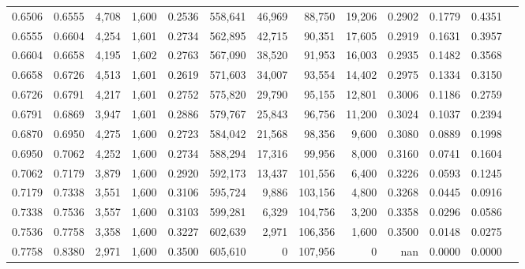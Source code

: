 \begin{tabular}{rrrrrrrrrrrrr}
0.6506 & 0.6555 &  4,708 & 1,600 &                                     0.2536 & 558,641 &  46,969 &  88,750 &  19,206 & 0.2902 & 0.1779 & 0.4351 \\
0.6555 & 0.6604 &  4,254 & 1,601 &                                     0.2734 & 562,895 &  42,715 &  90,351 &  17,605 & 0.2919 & 0.1631 & 0.3957 \\
0.6604 & 0.6658 &  4,195 & 1,602 &                                     0.2763 & 567,090 &  38,520 &  91,953 &  16,003 & 0.2935 & 0.1482 & 0.3568 \\
0.6658 & 0.6726 &  4,513 & 1,601 &                                     0.2619 & 571,603 &  34,007 &  93,554 &  14,402 & 0.2975 & 0.1334 & 0.3150 \\
0.6726 & 0.6791 &  4,217 & 1,601 &                                     0.2752 & 575,820 &  29,790 &  95,155 &  12,801 & 0.3006 & 0.1186 & 0.2759 \\
0.6791 & 0.6869 &  3,947 & 1,601 &                                     0.2886 & 579,767 &  25,843 &  96,756 &  11,200 & 0.3024 & 0.1037 & 0.2394 \\
0.6870 & 0.6950 &  4,275 & 1,600 &                                     0.2723 & 584,042 &  21,568 &  98,356 &   9,600 & 0.3080 & 0.0889 & 0.1998 \\
0.6950 & 0.7062 &  4,252 & 1,600 &                                     0.2734 & 588,294 &  17,316 &  99,956 &   8,000 & 0.3160 & 0.0741 & 0.1604 \\
0.7062 & 0.7179 &  3,879 & 1,600 &                                     0.2920 & 592,173 &  13,437 & 101,556 &   6,400 & 0.3226 & 0.0593 & 0.1245 \\
0.7179 & 0.7338 &  3,551 & 1,600 &                                     0.3106 & 595,724 &   9,886 & 103,156 &   4,800 & 0.3268 & 0.0445 & 0.0916 \\
0.7338 & 0.7536 &  3,557 & 1,600 &                                     0.3103 & 599,281 &   6,329 & 104,756 &   3,200 & 0.3358 & 0.0296 & 0.0586 \\
0.7536 & 0.7758 &  3,358 & 1,600 &                                     0.3227 & 602,639 &   2,971 & 106,356 &   1,600 & 0.3500 & 0.0148 & 0.0275 \\
0.7758 & 0.8380 &  2,971 & 1,600 &                                     0.3500 & 605,610 &       0 & 107,956 &       0 &    nan & 0.0000 & 0.0000 \\
\bottomrule
\end{tabular}
